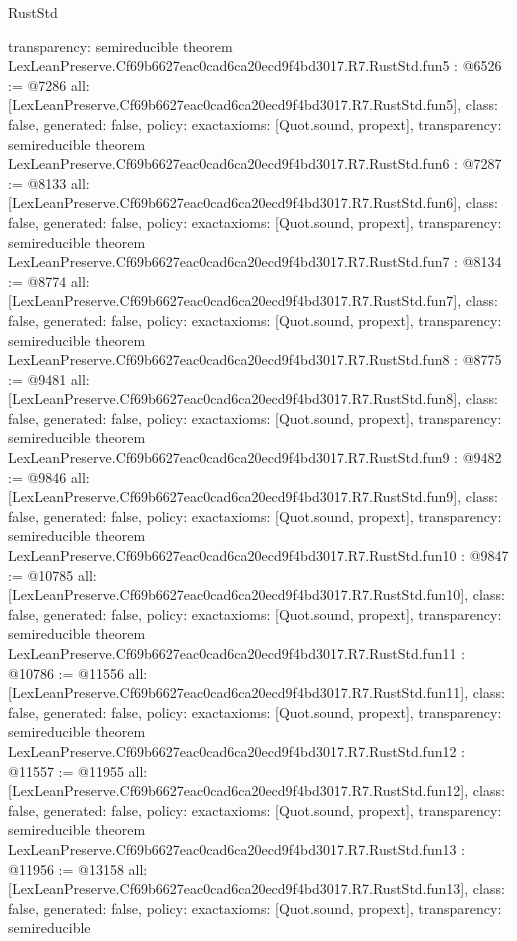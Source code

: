 \begin{lexlean}{RustStd}
\begin{coremodule}
{  transparency: semireducible
}
theorem LexLeanPreserve.Cf69b6627eac0cad6ca20ecd9f4bd3017.R7.RustStd.fun5 : @6526 := @7286 {
  all: [LexLeanPreserve.Cf69b6627eac0cad6ca20ecd9f4bd3017.R7.RustStd.fun5],
  class: false,
  generated: false,
  policy: exact{axioms: [Quot.sound, propext]},
  transparency: semireducible
}
theorem LexLeanPreserve.Cf69b6627eac0cad6ca20ecd9f4bd3017.R7.RustStd.fun6 : @7287 := @8133 {
  all: [LexLeanPreserve.Cf69b6627eac0cad6ca20ecd9f4bd3017.R7.RustStd.fun6],
  class: false,
  generated: false,
  policy: exact{axioms: [Quot.sound, propext]},
  transparency: semireducible
}
theorem LexLeanPreserve.Cf69b6627eac0cad6ca20ecd9f4bd3017.R7.RustStd.fun7 : @8134 := @8774 {
  all: [LexLeanPreserve.Cf69b6627eac0cad6ca20ecd9f4bd3017.R7.RustStd.fun7],
  class: false,
  generated: false,
  policy: exact{axioms: [Quot.sound, propext]},
  transparency: semireducible
}
theorem LexLeanPreserve.Cf69b6627eac0cad6ca20ecd9f4bd3017.R7.RustStd.fun8 : @8775 := @9481 {
  all: [LexLeanPreserve.Cf69b6627eac0cad6ca20ecd9f4bd3017.R7.RustStd.fun8],
  class: false,
  generated: false,
  policy: exact{axioms: [Quot.sound, propext]},
  transparency: semireducible
}
theorem LexLeanPreserve.Cf69b6627eac0cad6ca20ecd9f4bd3017.R7.RustStd.fun9 : @9482 := @9846 {
  all: [LexLeanPreserve.Cf69b6627eac0cad6ca20ecd9f4bd3017.R7.RustStd.fun9],
  class: false,
  generated: false,
  policy: exact{axioms: [Quot.sound, propext]},
  transparency: semireducible
}
theorem LexLeanPreserve.Cf69b6627eac0cad6ca20ecd9f4bd3017.R7.RustStd.fun10 : @9847 := @10785 {
  all: [LexLeanPreserve.Cf69b6627eac0cad6ca20ecd9f4bd3017.R7.RustStd.fun10],
  class: false,
  generated: false,
  policy: exact{axioms: [Quot.sound, propext]},
  transparency: semireducible
}
theorem LexLeanPreserve.Cf69b6627eac0cad6ca20ecd9f4bd3017.R7.RustStd.fun11 : @10786 := @11556 {
  all: [LexLeanPreserve.Cf69b6627eac0cad6ca20ecd9f4bd3017.R7.RustStd.fun11],
  class: false,
  generated: false,
  policy: exact{axioms: [Quot.sound, propext]},
  transparency: semireducible
}
theorem LexLeanPreserve.Cf69b6627eac0cad6ca20ecd9f4bd3017.R7.RustStd.fun12 : @11557 := @11955 {
  all: [LexLeanPreserve.Cf69b6627eac0cad6ca20ecd9f4bd3017.R7.RustStd.fun12],
  class: false,
  generated: false,
  policy: exact{axioms: [Quot.sound, propext]},
  transparency: semireducible
}
theorem LexLeanPreserve.Cf69b6627eac0cad6ca20ecd9f4bd3017.R7.RustStd.fun13 : @11956 := @13158 {
  all: [LexLeanPreserve.Cf69b6627eac0cad6ca20ecd9f4bd3017.R7.RustStd.fun13],
  class: false,
  generated: false,
  policy: exact{axioms: [Quot.sound, propext]},
  transparency: semireducible
}
\end{coremodule}
\end{lexlean}
